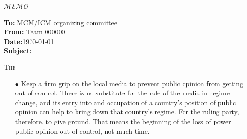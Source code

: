 \documentclass[12pt]{article}  %
\begin{document}
\begin{letter}{\huge{$\mathscr{MEMO}$}}
\begin{flushleft}  %
\textbf{To:} MCM/ICM organizing committee\\
\textbf{From:} Team 000000\\
\textbf{Date:}\today\\
\textbf{Subject:} 
\end{flushleft}
\lettrine{T}{he}
{\itshape \begin{enumerate}[0]
    \item[$\bullet$] Keep a firm grip on the local media to prevent public opinion from getting out of control. There is no substitute for the role of the media in regime change, and its entry into and occupation of a country's position of public opinion can help to bring down that country's regime. For the ruling party, therefore, to give ground. That means the beginning of the loss of power, public opinion out of control, not much time.
\end{enumerate}}

\end{letter}
\end{document}
